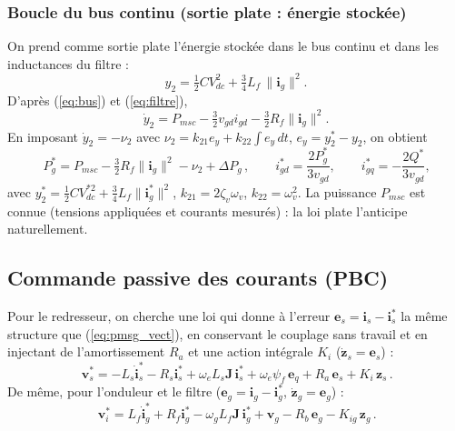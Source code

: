 \documentclass[11pt,a4paper]{article}
\theoremstyle{remark}
\newcommand{\Jm}{\mathbf{J}}            %
\newcommand{\vect}[1]{\bm{#1}}
\newcommand{\eq}{\vect{e}_q}
\begin{document}
\subsubsection{Boucle du bus continu (sortie plate : énergie stockée)}
On prend comme sortie plate l'énergie stockée dans le bus continu et dans les inductances du filtre :
\begin{equation}
  y_2 = \tfrac12 C V_{dc}^2 + \tfrac34 L_f\,\|\vect{i}_g\|^2 .
\end{equation}
D'après (\ref{eq:bus}) et (\ref{eq:filtre}),
\begin{equation}
  \dot y_2 = P_{msc} - \tfrac32 v_{gd} i_{gd} - \tfrac32 R_f\|\vect{i}_g\|^2 .
\end{equation}
En imposant $\dot y_2 = -\nu_2$ avec
$\nu_2 = k_{21}e_y + k_{22}\int e_y\,dt$, $e_y = y_2^* - y_2$, on obtient
\begin{equation}
  \boxed{\,P_g^* = P_{msc} - \tfrac32 R_f\|\vect{i}_g\|^2 - \nu_2 + \Delta P_g\,},\qquad
  i_{gd}^* = \frac{2P_g^*}{3 v_{gd}},\qquad i_{gq}^* = -\frac{2Q^*}{3 v_{gd}} ,
  \label{eq:plat_bus}
\end{equation}
avec $y_2^* = \tfrac12 C V_{dc}^{*2} + \tfrac34 L_f\|\vect{i}_g^*\|^2$,
$k_{21}=2\zeta_v\omega_v$, $k_{22}=\omega_v^2$. La puissance $P_{msc}$ est connue (tensions
appliquées et courants mesurés) : la loi plate l'anticipe naturellement.

\subsection{Commande passive des courants (PBC)}
Pour le redresseur, on cherche une loi qui donne à l'erreur $\vect{e}_s=\vect{i}_s-\vect{i}_s^*$ la même
structure que (\ref{eq:pmsg_vect}), en conservant le couplage sans travail et en injectant de
l'amortissement $R_a$ et une action intégrale $K_i$ ($\dot{\vect{z}}_s=\vect{e}_s$) :
\begin{equation}
  \boxed{\,\vect{v}_s^* = -L_s\dot{\vect{i}}_s^* - R_s\vect{i}_s^* + \omega_e L_s\Jm\,\vect{i}_s^*
  + \omega_e\psi_f\,\eq + R_a\,\vect{e}_s + K_i\,\vect{z}_s\,}.
  \label{eq:pbc_msc}
\end{equation}
De même, pour l'onduleur et le filtre ($\vect{e}_g=\vect{i}_g-\vect{i}_g^*$, $\dot{\vect{z}}_g=\vect{e}_g$) :
\begin{equation}
  \boxed{\,\vect{v}_i^* = L_f\dot{\vect{i}}_g^* + R_f\vect{i}_g^* - \omega_g L_f\Jm\,\vect{i}_g^*
  + \vect{v}_g - R_b\,\vect{e}_g - K_{ig}\,\vect{z}_g\,}.
  \label{eq:pbc_gsc}
\end{equation}
\end{document}
